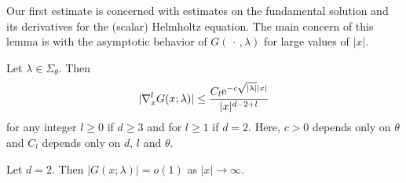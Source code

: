 Our first estimate is concerned with estimates on the fundamental solution and its derivatives for the (scalar) Helmholtz equation.
The main concern of this lemma is with the asymptotic behavior of $G(\,\cdot\,, \lambda)$ for large values of $|x|$.

\begin{lem}
  \label{lem:estimateHelmholtzDerivatives}
  Let $\lambda \in \Sigma_\theta$.
  Then
  \begin{align}
    \label{eq:estimateHelmholtzDerivatives}
    |\nabla_x^l G(x; \lambda)| \leq \frac{ C_l \mathrm{e}^{-c \sqrt{|\lambda|} |x|}}{|x|^{d - 2 + l}}
  \end{align}
  for any integer $l \geq 0$ if $d \geq 3$ and for $l \geq 1$ if $d = 2$.
  Here, $c > 0$ depends only on $\theta$ and $C_l$ depends only on $d$, $l$ and $\theta$.

  Let $d = 2$. Then $|G(x; \lambda)| = o(1)$ as $|x| \to \infty$.
\end{lem}

